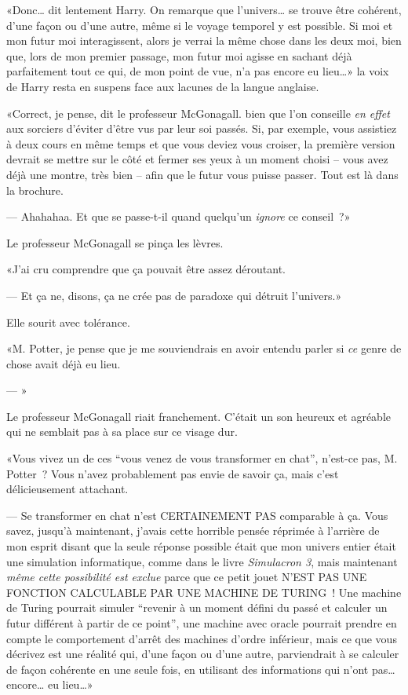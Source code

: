 «Donc… dit lentement Harry. On remarque que l'univers… se trouve être cohérent, d'une façon ou d'une autre, même si le voyage temporel y est possible. Si moi et mon futur moi interagissent, alors je verrai la même chose dans les deux moi, bien que, lors de mon premier passage, mon futur moi agisse en sachant déjà parfaitement tout ce qui, de mon point de vue, n'a pas encore eu lieu…» la voix de Harry resta en suspens face aux lacunes de la langue anglaise.

«Correct, je pense, dit le professeur McGonagall. bien que l'on conseille \emph{en effet} aux sorciers d'éviter d'être vus par leur soi passés. Si, par exemple, vous assistiez à deux cours en même temps et que vous deviez vous croiser, la première version devrait se mettre sur le côté et fermer ses yeux à un moment choisi -- vous avez déjà une montre, très bien -- afin que le futur vous puisse passer. Tout est là dans la brochure.

--- Ahahahaa. Et que se passe-t-il quand quelqu'un \emph{ignore} ce conseil~?»

Le professeur McGonagall se pinça les lèvres.

«J'ai cru comprendre que ça pouvait être assez déroutant.

--- Et ça ne, disons, ça ne crée pas de paradoxe qui détruit l'univers.»

Elle sourit avec tolérance.

«M. Potter, je pense que je me souviendrais en avoir entendu parler si \emph{ce} genre de chose avait déjà eu lieu.

--- »

Le professeur McGonagall riait franchement. C'était un son heureux et agréable qui ne semblait pas à sa place sur ce visage dur.

«Vous vivez un de ces “vous venez de vous transformer en chat”, n'est-ce pas, M. Potter~? Vous n'avez probablement pas envie de savoir ça, mais c'est délicieusement attachant.

--- Se transformer en chat n'est CERTAINEMENT PAS comparable à ça. Vous savez, jusqu'à maintenant, j'avais cette horrible pensée réprimée à l'arrière de mon esprit disant que la seule réponse possible était que mon univers entier était une simulation informatique, comme dans le livre \emph{Simulacron 3}, mais maintenant \emph{même cette possibilité est exclue} parce que ce petit jouet N'EST PAS UNE FONCTION CALCULABLE PAR UNE MACHINE DE TURING~! Une machine de Turing pourrait simuler “revenir à un moment défini du passé et calculer un futur différent à partir de ce point”, une machine avec oracle pourrait prendre en compte le comportement d'arrêt des machines d'ordre inférieur, mais ce que vous décrivez est une réalité qui, d'une façon ou d'une autre, parviendrait à se calculer de façon cohérente en une seule fois, en utilisant des informations qui n'ont pas… encore… eu lieu…»

